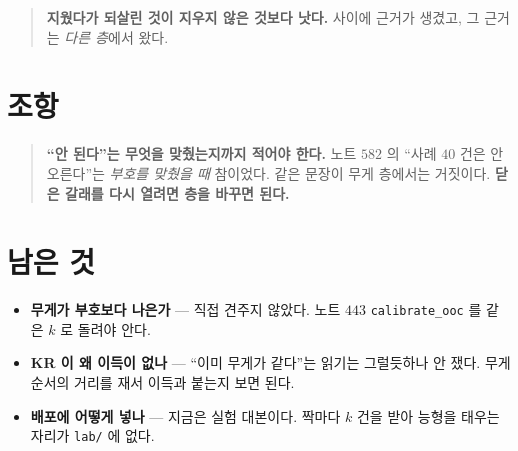 \documentclass[11pt]{article}
\begin{document}
\begin{quote}
\textbf{지웠다가 되살린 것이 지우지 않은 것보다 낫다.} 사이에 근거가
생겼고, 그 근거는 \emph{다른 층}에서 왔다.
\end{quote}

\section*{조항}

\begin{quote}
\textbf{``안 된다''는 무엇을 맞췄는지까지 적어야 한다.} 노트 $582$ 의
``사례 $40$ 건은 안 오른다''는 \emph{부호를 맞췄을 때} 참이었다.
같은 문장이 무게 층에서는 거짓이다. \textbf{닫은 갈래를 다시 열려면
층을 바꾸면 된다.}
\end{quote}

\section*{남은 것}

\begin{itemize}
\item \textbf{무게가 부호보다 나은가} --- 직접 견주지 않았다. 노트 $443$
\texttt{calibrate\_ooc} 를 같은 $k$ 로 돌려야 안다.
\item \textbf{KR 이 왜 이득이 없나} --- ``이미 무게가 같다''는 읽기는
그럴듯하나 안 쟀다. 무게 순서의 거리를 재서 이득과 붙는지 보면 된다.
\item \textbf{배포에 어떻게 넣나} --- 지금은 실험 대본이다. 짝마다 $k$ 건을
받아 능형을 태우는 자리가 \texttt{lab/} 에 없다.
\end{itemize}
\end{document}
